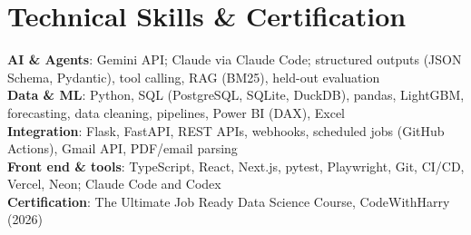 \documentclass[letterpaper,10pt]{article}
\begin{document}
\section{Technical Skills \& Certification}
 \begin{itemize}[leftmargin=0.15in, label={}]
    \small{\item{
     \textbf{AI \& Agents}{: Gemini API; Claude via Claude Code; structured outputs (JSON Schema, Pydantic), tool calling, RAG (BM25), held-out evaluation} \\
     \textbf{Data \& ML}{: Python, SQL (PostgreSQL, SQLite, DuckDB), pandas, LightGBM, forecasting, data cleaning, pipelines, Power BI (DAX), Excel} \\
     \textbf{Integration}{: Flask, FastAPI, REST APIs, webhooks, scheduled jobs (GitHub Actions), Gmail API, PDF/email parsing} \\
     \textbf{Front end \& tools}{: TypeScript, React, Next.js, pytest, Playwright, Git, CI/CD, Vercel, Neon; Claude Code and Codex} \\
     \textbf{Certification}{: The Ultimate Job Ready Data Science Course, CodeWithHarry (2026)}
    }}
 \end{itemize}
\end{document}
